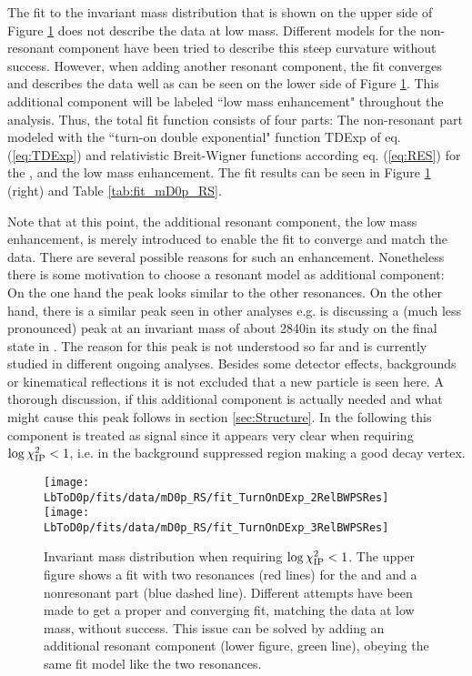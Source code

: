 The fit to the invariant \Dz\proton mass distribution that is shown on the upper side of Figure \ref{fig:fit_mD0p_RS} does not describe the data at low \Dz\proton mass.
Different models for the non-resonant component have been tried to describe this steep curvature without success.
However, when adding another resonant component, the fit converges and describes the data well as can be seen on the lower side of Figure \ref{fig:fit_mD0p_RS}.
This additional component will be labeled ``low mass enhancement" throughout the analysis.
Thus, the total fit function consists of four parts: 
The non-resonant part modeled with the ``turn-on double exponential" function TDExp of eq. (\ref{eq:TDExp}) and relativistic Breit-Wigner functions according eq. (\ref{eq:RES}) for the \LcResI, \LcResII and the low mass enhancement. 
The fit results can be seen in Figure \ref{fig:fit_mD0p_RS} (right) and Table \ref{tab:fit_mD0p_RS}.

Note that at this point, the additional resonant component, the low mass enhancement, is merely introduced to enable the fit to converge and match the data.
There are several possible reasons for such an enhancement.
Nonetheless there is some motivation to choose a resonant model as additional component:
On the one hand the peak looks similar to the other resonances.
On the other hand, there is a similar peak seen in other analyses e.g. \babar is discussing a (much less pronounced) peak at an invariant \Dz\proton mass of about 2840\mev in its study on the \Dz\proton final state in \cite{BaBar_D0p}.
The reason for this peak is not understood so far and is currently studied in different ongoing \lhcb analyses.
Besides some detector effects, backgrounds or kinematical reflections it is not excluded that a new particle is seen here.
A thorough discussion, if this additional component is actually needed and what might cause this peak follows in section \ref{sec:Structure}.
In the following this component is treated as signal since it appears very clear when requiring $\log \chi^2_{\text{IP}} < 1$, i.e. in the background suppressed region making a good decay vertex.
\begin{figure}[tb]
    \centering
	\texttt{[image: LbToD0p/fits/data/mD0p\_RS/fit\_TurnOnDExp\_2RelBWPSRes]} \\
	\texttt{[image: LbToD0p/fits/data/mD0p\_RS/fit\_TurnOnDExp\_3RelBWPSRes]}
	\caption{Invariant \Dz\proton mass distribution when requiring $\log \chi^2_{\text{IP}} < 1$. 
             The upper figure shows a fit with two resonances (red lines) for the \LcResI and \LcResII and a nonresonant part (blue dashed line). 
             Different attempts have been made to get a proper and converging fit, matching the data at low \Dz\proton mass, without success. 
             This issue can be solved by adding an additional resonant component (lower figure, green line), obeying the same fit model like the two resonances.}
    \label{fig:fit_mD0p_RS}
\end{figure}


